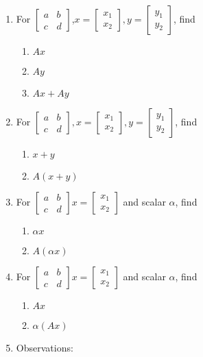 \documentclass[11pt,fleqn]{article}
\newcommand{\bbm}{\begin{bmatrix}}
\newcommand{\ebm}{\end{bmatrix}}
\def\vectwo#1#2{\begin{bmatrix}#1\\#2\end{bmatrix}}
\begin{document}
\renewcommand{\headrulewidth}{0pt}
\newcommand{\blank}[1]{\rule{#1}{0.75pt}}
\renewcommand{\d}{\displaystyle}
\vspace*{-0.7in}
\begin{center}
 \textbf{ \large {} }
\end{center}

\begin{enumerate}
\item For $\bbm a&b\\c&d \ebm$,\;$x=\vectwo{x_1}{x_2},$\;$y=\vectwo{y_1}{y_2}$, find
	\begin{enumerate}
	\item $Ax$
	\vfill
	\item $Ay$
	\vfill
	\item $Ax+Ay$
	\vfill
	\end{enumerate}
\item For $\bbm a&b\\c&d \ebm,$\;$x=\vectwo{x_1}{x_2},$\;$y=\vectwo{y_1}{y_2}$, find
	\begin{enumerate}
	\item $x+y$
	\vfill
	\item $A(x+y)$
	\vfill
	\end{enumerate}
\newpage
\item For $\bbm a&b\\c&d \ebm$\;$x=\vectwo{x_1}{x_2}$\; and scalar $\alpha$, find
	\begin{enumerate}
	\item $\alpha x$
	\vfill
	\item $A(\alpha x)$
	\vfill
	\end{enumerate}
\item For $\bbm a&b\\c&d \ebm$\;$x=\vectwo{x_1}{x_2}$\; and scalar $\alpha$, find
	\begin{enumerate}
	\item $Ax$
	\vfill
	\item $\alpha(Ax)$
	\vfill
	\end{enumerate}
\item Observations:
\vspace{3in}
\end{enumerate}
\end{document}
